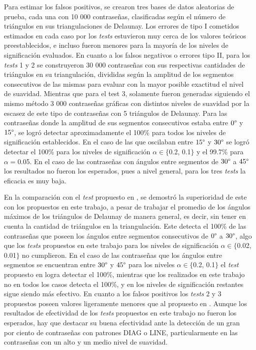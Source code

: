 \documentclass[12pt]{report}
\begin{document}
Para estimar los falsos positivos, se crearon tres bases de datos aleatorias de prueba, cada una con 10 000 contraseñas, clasificadas según el número de triángulos en sus triangulaciones de Delaunay. Los errores de tipo I cometidos estimados en cada caso por los \textit{tests} estuvieron muy cerca de los valores teóricos preestablecidos, e incluso fueron menores para la mayoría de los niveles de significación evaluados. En cuanto a los falsos negativos o errores tipo II, para los \textit{tests} 1 y 2 se construyeron 30 000 contraseñas con sus respectivas cantidades de triángulos en  su triangulación, divididas según la amplitud de los segmentos consecutivos de las mismas para evaluar con la mayor posible exactitud el nivel de suavidad. Mientras que para el test 3, solamente fueron generadas siguiendo el mismo método 3 000 contraseñas gráficas con distintos niveles de suavidad por la escasez de este tipo de contraseñas con 5 triángulos de Delaunay. Para las contraseñas donde  la amplitud de sus segmentos consecutivos estaba entre $0\degree$ y $15\degree$, se logró detectar aproximadamente el 100\% para todos los niveles de significación establecidos. En el caso de las que oscilaban entre $15\degree$ y $30\degree$  se logró detectar el 100\% para los niveles de significación $\alpha \in \{$0.2, 0.1$\}$ y el 99.7\% para $\alpha=$0.05. En el caso de las contraseñas con ángulos entre segmentos de $30\degree$ a $45\degree$  los resultados no fueron los esperados, pues a nivel general, para los tres \textit{tests}  la eficacia es muy baja.

En la comparación con el \textit{test} propuesto en \cite{13}, se demostró la superioridad de este con los propuestos en este trabajo, a pesar de trabajar el promedio de los ángulos máximos de los triángulos de Delaunay de manera general, es decir, sin tener en cuenta la cantidad de triángulos en  la triangulación. Este detecta el 100\% de las contraseñas que poseen los ángulos entre segmentos consecutivos de $0\degree$ a $30\degree$, algo que los \textit{tests} propuestos en este trabajo para los niveles de significación $\alpha \in \{$0.02, 0.01$\}$ no cumplieron. En el caso de las contraseñas que los ángulos entre segmentos se encuentran entre $30\degree$ y $45\degree$ para los niveles $\alpha \in \{$0.2, 0.1$\}$ el \textit{test} propuesto en \cite{13} logra detectar el 100\%, mientras que los realizados en este trabajo no en todos los casos detecta el 100\%, y en los niveles de significación restantes sigue siendo más efectivo. En cuanto a los falsos positivos los \textit{tests} 2 y 3 propuestos poseen valores ligeramente menores que al propuesto en \cite{13}. Aunque los resultados de efectividad de los \textit{tests} propuestos en este trabajo no fueron los esperados, hay que destacar su buena efectividad ante la detección de un gran por ciento de contraseñas con patrones DIAG o LINE, particularmente en las contraseñas con un alto y un medio nivel de suavidad.
\end{document}
